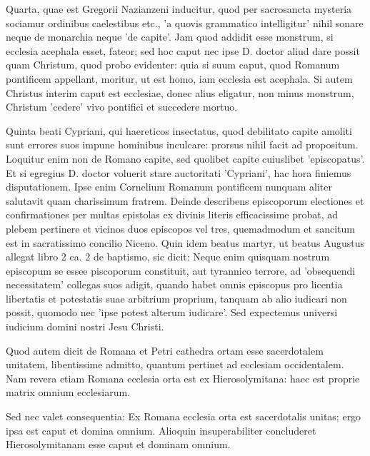 \marginpar{\small[258]} Quarta, quae est Gregorii Nazianzeni inducitur, quod per sacrosancta mysteria sociamur ordinibus caelestibus etc., 'a quovis grammatico intelligitur' nihil sonare neque de monarchia neque 'de capite'. Jam quod addidit esse monstrum, si ecclesia acephala esset, fateor; sed hoc caput nec ipse D. doctor aliud dare possit quam Christum, quod probo evidenter: quia si suum caput, quod Romanum pontificem appellant, moritur, ut est homo, iam ecclesia est acephala. Si autem Christus interim caput est ecclesiae, donec alius eligatur, non minus monstrum, Christum 'cedere' vivo pontifici et succedere mortuo.

Quinta beati Cypriani, qui haereticos insectatus, quod debilitato capite amoliti sunt errores suos impune hominibus inculcare: prorsus nihil facit ad propositum. Loquitur enim non de Romano capite, sed quolibet capite cuiuslibet 'episcopatus'. Et si egregius D. doctor voluerit stare auctoritati 'Cypriani', hac hora finiemus disputationem. Ipse enim Cornelium Romanum pontificem nunquam aliter salutavit quam charissimum fratrem. Deinde describens episcoporum electiones et confirmationes per multas epistolas ex divinis literis efficacissime probat, ad plebem pertinere et vicinos duos episcopos vel tres, quemadmodum et sancitum est in sacratissimo concilio Niceno. Quin idem beatus martyr, ut beatus Augustus allegat libro 2 ca. 2 de baptismo, sic dicit: Neque enim quisquam nostrum episcopum se essee piscoporum constituit, aut tyrannico terrore, ad 'obsequendi necessitatem' collegas suos adigit, quando habet omnis episcopus pro licentia libertatis et potestatis suae arbitrium proprium, tanquam ab alio iudicari non possit, quomodo nec 'ipse potest alterum iudicare'. Sed expectemus universi iudicium domini nostri Jesu Christi.

Quod autem dicit de Romana et Petri cathedra ortam esse sacerdotalem unitatem, libentissime admitto, quantum pertinet ad ecclesiam occidentalem. Nam revera etiam Romana ecclesia orta est ex Hierosolymitana: haec est proprie matrix omnium ecclesiarum.

Sed nec valet consequentia: Ex Romana ecclesia orta est sacerdotalis unitas; ergo ipsa est caput et domina omnium. Alioquin insuperabiliter concluderet Hierosolymitanam esse caput et dominam omnium.

